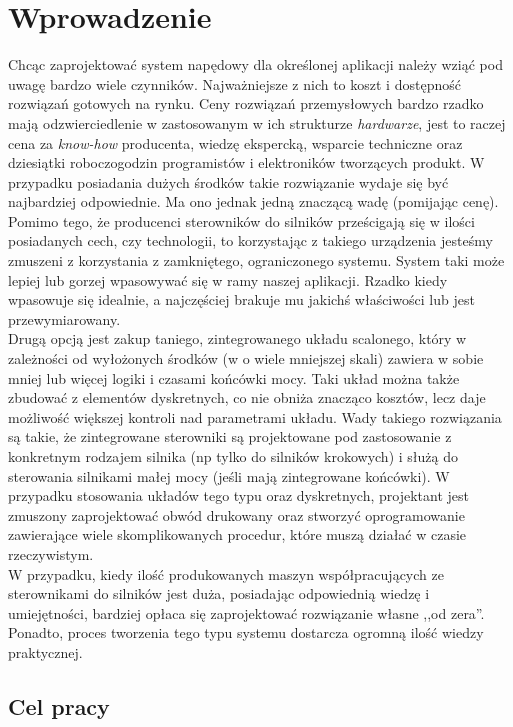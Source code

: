 \section*{Wprowadzenie}

Chcąc zaprojektować system napędowy dla określonej aplikacji należy wziąć pod uwagę bardzo wiele czynników. Najważniejsze z nich to koszt i dostępność rozwiązań gotowych na rynku. Ceny rozwiązań przemysłowych bardzo rzadko mają odzwierciedlenie w zastosowanym w ich strukturze {\it hardwarze}, jest to raczej cena za {\it know-how} producenta, wiedzę ekspercką, wsparcie techniczne oraz dziesiątki roboczogodzin programistów i elektroników tworzących produkt. W przypadku posiadania dużych środków takie rozwiązanie wydaje się być najbardziej odpowiednie. Ma ono jednak jedną znaczącą wadę (pomijając cenę). Pomimo tego, że producenci sterowników do silników prześcigają się w ilości posiadanych cech, czy technologii, to korzystając z takiego urządzenia jesteśmy zmuszeni z korzystania z zamkniętego, ograniczonego systemu. System taki może lepiej lub gorzej wpasowywać się w ramy naszej aplikacji. Rzadko kiedy wpasowuje się idealnie, a najczęściej brakuje mu jakichś właściwości lub jest przewymiarowany. \\

Drugą opcją jest zakup taniego, zintegrowanego układu scalonego, który w zależności od wyłożonych środków (w o wiele mniejszej skali) zawiera w sobie mniej lub więcej logiki i czasami końcówki mocy. Taki układ można także zbudować z elementów dyskretnych, co nie obniża znacząco kosztów, lecz daje możliwość większej kontroli nad parametrami układu. Wady takiego rozwiązania są takie, że zintegrowane sterowniki są projektowane pod zastosowanie z konkretnym rodzajem silnika (np tylko do silników krokowych) i służą do sterowania silnikami małej mocy (jeśli mają zintegrowane końcówki). W przypadku stosowania układów tego typu oraz dyskretnych, projektant jest zmuszony zaprojektować obwód drukowany oraz stworzyć oprogramowanie zawierające wiele skomplikowanych procedur, które muszą działać w czasie rzeczywistym. \\

W przypadku, kiedy ilość produkowanych maszyn współpracujących ze sterownikami do silników jest duża, posiadając odpowiednią wiedzę i umiejętności, bardziej opłaca się zaprojektować rozwiązanie własne ,,od zera''. Ponadto, proces tworzenia tego typu systemu dostarcza ogromną ilość wiedzy praktycznej.
  
\subsection*{Cel pracy}

